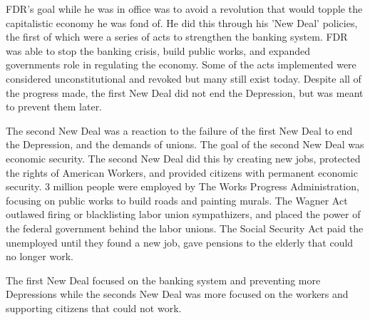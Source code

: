 FDR's goal while he was in office was to avoid a revolution that would topple the capitalistic economy he was fond of.
He did this through his 'New Deal' policies, the first of which were a series of acts to strengthen the banking system.
FDR was able to stop the banking crisis, build public works, and expanded governments role in regulating the economy.
Some of the acts implemented were considered unconstitutional and revoked but many still exist today.
Despite all of the progress made, the first New Deal did not end the Depression, but was meant to prevent them later.

The second New Deal was a reaction to the failure of the first New Deal to end the Depression, and the demands of unions.
The goal of the second New Deal was economic security.
The second New Deal did this by creating new jobs, protected the rights of American Workers, and provided citizens with permanent economic security.
3 million people were employed by The Works Progress Administration, focusing on public works to build roads and painting murals.
The Wagner Act outlawed firing or blacklisting labor union sympathizers, and placed the power of the federal government behind the labor unions.
The Social Security Act paid the unemployed until they found a new job, gave pensions to the elderly that could no longer work.

The first New Deal focused on the banking system and preventing more Depressions while the seconds New Deal was more focused on the workers and supporting citizens that could not work.